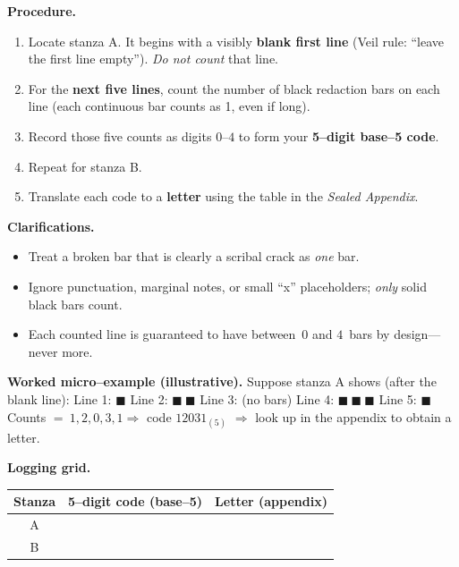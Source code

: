 \documentclass[11pt]{article}
\begin{document}
\begin{itemize}
\medskip
\noindent\textbf{Procedure.}
\begin{enumerate}\setlength\itemsep{0.2em}
  \item Locate stanza \textsc{A}. It begins with a visibly \textbf{blank first line} (Veil rule: “leave the first line empty”). \emph{Do not count} that line.
  \item For the \textbf{next five lines}, count the number of black redaction bars on each line (each continuous bar counts as 1, even if long).
  \item Record those five counts as digits \(0\)–\(4\) to form your \textbf{5–digit base–5 code}.
  \item Repeat for stanza \textsc{B}.
  \item Translate each code to a \textbf{letter} using the table in the \emph{Sealed Appendix}.
\end{enumerate}

\medskip
\noindent\textbf{Clarifications.}
\begin{itemize}\setlength\itemsep{0.25em}
  \item Treat a broken bar that is clearly a scribal crack as \emph{one} bar.
  \item Ignore punctuation, marginal notes, or small “x” placeholders; \emph{only} solid black bars count.
  \item Each counted line is guaranteed to have between \(\,0\) and \(4\,\) bars by design—never more.
\end{itemize}

\medskip
\noindent\textbf{Worked micro–example (illustrative).}  
Suppose stanza \textsc{A} shows (after the blank line):  
Line 1: \(\blacksquare\) \quad Line 2: \(\blacksquare\ \blacksquare\) \quad Line 3: (no bars) \quad Line 4: \(\blacksquare\ \blacksquare\ \blacksquare\) \quad Line 5: \(\blacksquare\)  
Counts \(=\ 1,2,0,3,1 \Rightarrow\) code \(12031_{(5)}\) \(\Rightarrow\) look up in the appendix to obtain a letter.

\medskip
\noindent\textbf{Logging grid.}
\begin{center}
\begin{tabular}{c|c|c}
\textbf{Stanza} & \textbf{5–digit code (base–5)} & \textbf{Letter (appendix)} \\
\hline
A & \hspace{3.5cm} & \hspace{1.2cm} \\
B & \hspace{3.5cm} & \hspace{1.2cm} \\
\end{tabular}
\end{center}


\end{itemize}
\end{document}

